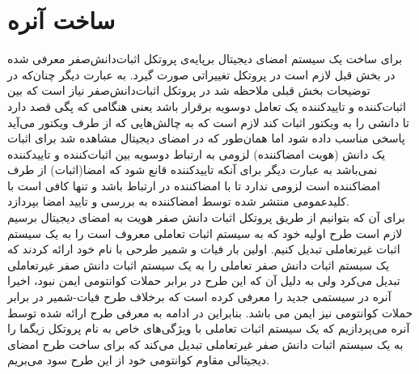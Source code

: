 \section{ساخت آنره}\label{unruh}

برای ساخت یک سیستم امضای دیجیتال برپایه‌ی پروتکل اثبات‌دانش‌صفر معرفی شده در بخش قبل لازم است در پروتکل تغییراتی صورت گیرد. به عبارت دیگر چنان‌که در توضیحات بخش قبلی ملاحظه شد در پروتکل اثبات‌دانش‌صفر نیاز است که بین اثبات‌کننده و تاییدکننده یک تعامل دوسویه برقرار باشد یعنی هنگامی که پگی قصد دارد تا دانشی را به ویکتور اثبات کند لازم است که به چالش‌هایی که از طرف ویکتور می‌آید پاسخی مناسب داده شود  اما همان‌طور که در امضای دیجیتال مشاهده شد برای اثبات یک دانش (هویت امضاکننده) لزومی به ارتباط دوسویه بین اثبات‌کننده و تاییدکننده نمی‌باشد به عبارت دیگر برای آنکه تاییدکننده قانع شود که امضا(اثبات) از طرف امضاکننده است لزومی ندارد تا با امضاکننده در ارتباط باشد و تنها کافی است با کلیدعمومی منتشر شده توسط امضاکننده به بررسی و تایید امضا بپردازد. 
\\
برای آن که بتوانیم از طریق پروتکل اثبات دانش صفر هویت به امضای دیجیتال برسیم لازم است طرح اولیه خود که به سیستم اثبات تعاملی 
معروف است را به یک سیستم اثبات غیرتعاملی
 تبدیل کنیم. اولین بار فیات و شمیر طرحی با نام خود ارائه کردند
\cite{fiat@prove}
که یک سیستم اثبات دانش صفر تعاملی را به یک سیستم اثبات دانش صفر غیرتعاملی تبدیل می‌کرد ولی به دلیل آن که این طرح در برابر حملات کوانتومی ایمن نبود، اخیرا آنره در
\cite{unruh}
سیستمی  جدید را معرفی کرده است که برخلاف طرح فیات-شمیر در برابر حملات کوانتومی نیز ایمن می باشد. بنابراین در ادامه به معرفی طرح ارائه شده توسط آنره می‌پردازیم که یک سیستم اثبات تعاملی با ویژگی‌های خاص به نام پروتکل زیگما را به یک سیستم اثبات دانش صفر غیرتعاملی تبدیل می‌کند که برای ساخت طرح امضای دیجیتالی مقاوم کوانتومی خود از این طرح سود می‌بریم.
\iffalse
یک سیستم اثبات دانش صفر تعاملی را به سیستم اثبات دانش صفر غیرتعاملی متناظر با آن انتقال می‌دهد. این ساخت ، ویژگی استخراج آنلاین
\LTRfootnote{online extractability}
را که اجازه می‌دهد شاهد(کلید خصوصی) را از یک متخاصم موفق بدون چرخش
\LTRfootnote{rewinding}
استخراج کنیم ، را دارا می‌باشد.
\fi
\iffalse
در ابتدای امر این فرص را داریم که تمام بخش های این پروتکل به یک اوراکل تصادفی کوانتومی 
\LTRfootnote{quantum random oracle}
$H$
دسترسی دارند.
\fi
\\
